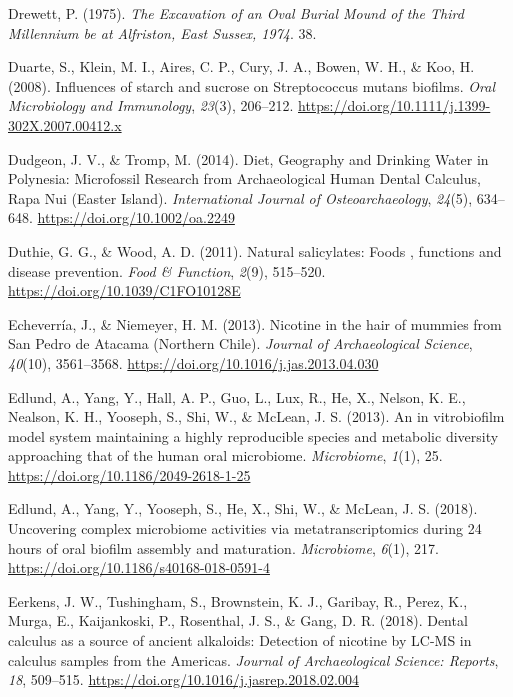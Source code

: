 \documentclass[
  letterpaper,
]{book}
\newlength{\cslhangindent}
\newlength{\cslentryspacingunit} %
\newenvironment{CSLReferences}[2] %
 {%
  \setlength{\parindent}{0pt}
  \ifodd #1
  \let\oldpar\par
  \def\par{\hangindent=\cslhangindent\oldpar}
  \fi
  \setlength{\parskip}{#2\cslentryspacingunit}
 }%
 {}
\begin{document}
\begin{CSLReferences}{1}{0}
\leavevmode{}%
Drewett, P. (1975). \emph{The {Excavation} of an {Oval Burial Mound} of
the {Third Millennium} be at {Alfriston}, {East Sussex}, 1974}. 38.

\leavevmode{}%
Duarte, S., Klein, M. I., Aires, C. P., Cury, J. A., Bowen, W. H., \&
Koo, H. (2008). Influences of starch and sucrose on {Streptococcus}
mutans biofilms. \emph{Oral Microbiology and Immunology}, \emph{23}(3),
206--212. \url{https://doi.org/10.1111/j.1399-302X.2007.00412.x}

\leavevmode{}%
Dudgeon, J. V., \& Tromp, M. (2014). Diet, {Geography} and {Drinking
Water} in {Polynesia}: {Microfossil Research} from {Archaeological Human
Dental Calculus}, {Rapa Nui} ({Easter Island}). \emph{International
Journal of Osteoarchaeology}, \emph{24}(5), 634--648.
\url{https://doi.org/10.1002/oa.2249}

\leavevmode{}%
Duthie, G. G., \& Wood, A. D. (2011). Natural salicylates: Foods ,
functions and disease prevention. \emph{Food \& Function}, \emph{2}(9),
515--520. \url{https://doi.org/10.1039/C1FO10128E}

\leavevmode{}%
Echeverría, J., \& Niemeyer, H. M. (2013). Nicotine in the hair of
mummies from {San Pedro} de {Atacama} ({Northern Chile}). \emph{Journal
of Archaeological Science}, \emph{40}(10), 3561--3568.
\url{https://doi.org/10.1016/j.jas.2013.04.030}

\leavevmode{}%
Edlund, A., Yang, Y., Hall, A. P., Guo, L., Lux, R., He, X., Nelson, K.
E., Nealson, K. H., Yooseph, S., Shi, W., \& McLean, J. S. (2013). An in
vitrobiofilm model system maintaining a highly reproducible species and
metabolic diversity approaching that of the human oral microbiome.
\emph{Microbiome}, \emph{1}(1), 25.
\url{https://doi.org/10.1186/2049-2618-1-25}

\leavevmode{}%
Edlund, A., Yang, Y., Yooseph, S., He, X., Shi, W., \& McLean, J. S.
(2018). Uncovering complex microbiome activities via metatranscriptomics
during 24 hours of oral biofilm assembly and maturation.
\emph{Microbiome}, \emph{6}(1), 217.
\url{https://doi.org/10.1186/s40168-018-0591-4}

\leavevmode{}%
Eerkens, J. W., Tushingham, S., Brownstein, K. J., Garibay, R., Perez,
K., Murga, E., Kaijankoski, P., Rosenthal, J. S., \& Gang, D. R. (2018).
Dental calculus as a source of ancient alkaloids: {Detection} of
nicotine by {LC-MS} in calculus samples from the {Americas}.
\emph{Journal of Archaeological Science: Reports}, \emph{18}, 509--515.
\url{https://doi.org/10.1016/j.jasrep.2018.02.004}


\end{CSLReferences}
\end{document}
